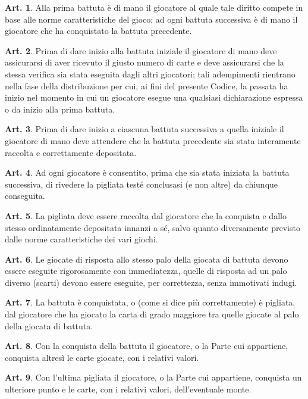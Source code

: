 \documentclass[italian,a4paper]{article}
\theoremstyle{definition}
\newtheorem{art}{Art.}
\begin{document}
\begin{art}
    Alla prima battuta è di mano il giocatore al quale tale diritto compete in base alle norme caratteristiche del gioco; ad ogni battuta successiva è di mano il giocatore che ha conquistato la battuta precedente.
\end{art}
\begin{art}
    Prima di dare inizio alla battuta iniziale il giocatore di mano deve assicurarsi di aver ricevuto il giusto numero di carte e deve assicurarsi che la stessa verifica sia stata eseguita dagli altri giocatori; tali adempimenti rientrano nella fase della distribuzione per cui, ai fini del presente Codice, la passata ha inizio nel momento in cui un giocatore esegue una qualsiasi dichiarazione espressa o da inizio alla prima battuta.
\end{art}
\begin{art}
    Prima di dare inizio a ciascuna battuta successiva a quella iniziale il giocatore di mano deve attendere che la battuta precedente sia stata interamente raccolta e correttamente depositata.
\end{art}
\begin{art}
    Ad ogni giocatore è consentito, prima che sia stata iniziata la battuta successiva, di rivedere la pigliata testé conclusasi  (e non altre) da chiunque conseguita.
\end{art}
\begin{art}
    La pigliata deve essere raccolta dal giocatore che la conquista e dallo stesso ordinatamente depositata innanzi a sé, salvo quanto diversamente previsto dalle norme caratteristiche dei vari giochi.
\end{art}
\begin{art}
    Le giocate di risposta allo stesso palo della giocata di battuta devono essere eseguite rigorosamente con immediatezza, quelle di risposta ad un palo diverso (scarti) devono essere eseguite, per correttezza, senza immotivati indugi.
\end{art}
\begin{art}
    La battuta è conquistata, o (come si dice più correttamente) è pigliata, dal giocatore che ha giocato la carta di grado maggiore tra quelle giocate al palo della giocata di battuta.
\end{art}
\begin{art}
    Con la conquista della battuta il giocatore, o la Parte cui appartiene, conquista altresì le carte giocate, con i relativi valori.
\end{art}
\begin{art}
    Con l'ultima pigliata il giocatore, o la Parte cui appartiene, conquista un ulteriore punto e le carte, con i relativi valori, dell'eventuale monte.
\end{art}
\end{document}
